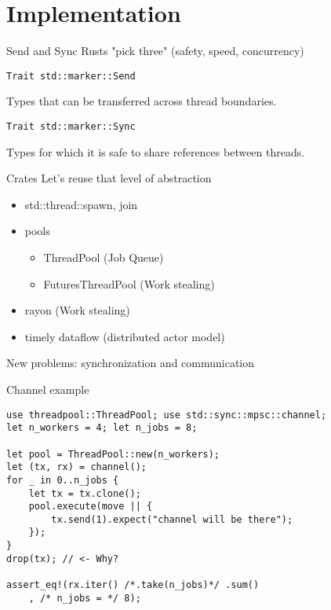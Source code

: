 \documentclass[aspectratio=1610,t]{beamer}
\begin{document}
{
\section{Implementation}
}

\begin{frame}[fragile]{Send and Sync}
Rusts "pick three" (safety, speed, concurrency)

\begin{verbatim}
Trait std::marker::Send
\end{verbatim}
Types that can be transferred across thread boundaries.

\begin{verbatim}
Trait std::marker::Sync
\end{verbatim}
Types for which it is safe to share references between threads.

\end{frame}

\begin{frame}[fragile]{Crates}
Let's reuse that level of abstraction
\begin{itemize}
  \item std::thread::{spawn, join}
  \item pools \begin{itemize}
      \item ThreadPool (Job Queue)
      \item FuturesThreadPool (Work stealing)
    \end{itemize}
  \item rayon (Work stealing)
  \item timely dataflow (distributed actor model)
\end{itemize}

New problems: synchronization and communication

\end{frame}

\begin{frame}[fragile]{Channel example}
\begin{verbatim}
use threadpool::ThreadPool; use std::sync::mpsc::channel;
let n_workers = 4; let n_jobs = 8;

let pool = ThreadPool::new(n_workers);
let (tx, rx) = channel();
for _ in 0..n_jobs {
    let tx = tx.clone();
    pool.execute(move || {
        tx.send(1).expect("channel will be there");
    });
}
drop(tx); // <- Why?

assert_eq!(rx.iter() /*.take(n_jobs)*/ .sum()
    , /* n_jobs = */ 8);
\end{verbatim}
\end{frame}
\end{document}
